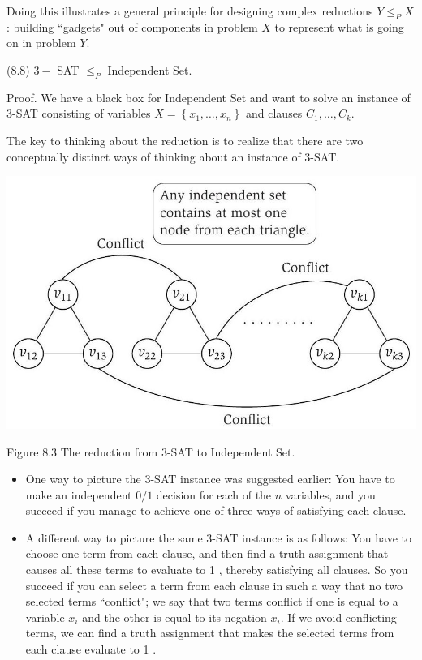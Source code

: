 \documentclass[a4paper, 12pt]{book}
\theoremstyle{dotless}
\begin{document}
Doing this illustrates a general principle for designing complex reductions $Y \leq_{P} X$ : building ``gadgets" out of components in problem $X$ to represent what is going on in problem $Y$.

(8.8) $3-$ SAT $\leq_{P}$ Independent Set.

Proof. We have a black box for Independent Set and want to solve an instance of 3-SAT consisting of variables $X=\left\{x_{1}, \ldots, x_{n}\right\}$ and clauses $C_{1}, \ldots, C_{k}$.

The key to thinking about the reduction is to realize that there are two conceptually distinct ways of thinking about an instance of 3-SAT.


\begin{center}
\includegraphics[width=\textwidth]{2023_01_31_a1ea3121d626c5d81538g-11}
\end{center}

Figure 8.3 The reduction from 3-SAT to Independent Set.

\begin{itemize}
  \item One way to picture the 3-SAT instance was suggested earlier: You have to make an independent $0 / 1$ decision for each of the $n$ variables, and you succeed if you manage to achieve one of three ways of satisfying each clause.

  \item A different way to picture the same 3-SAT instance is as follows: You have to choose one term from each clause, and then find a truth assignment that causes all these terms to evaluate to 1 , thereby satisfying all clauses. So you succeed if you can select a term from each clause in such a way that no two selected terms ``conflict"; we say that two terms conflict if one is equal to a variable $x_{i}$ and the other is equal to its negation $\overline{x_{i}}$. If we avoid conflicting terms, we can find a truth assignment that makes the selected terms from each clause evaluate to 1 .

\end{itemize}
\end{document}
